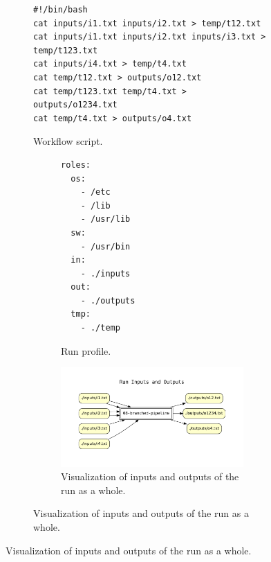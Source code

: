 \begin{figure}[h!]
    
    \begin{subfigure}[b]{1.0\linewidth}
        \begin{lstlisting}
#!/bin/bash
cat inputs/i1.txt inputs/i2.txt > temp/t12.txt
cat inputs/i1.txt inputs/i2.txt inputs/i3.txt > temp/t123.txt
cat inputs/i4.txt > temp/t4.txt
cat temp/t12.txt > outputs/o12.txt
cat temp/t123.txt temp/t4.txt > outputs/o1234.txt
cat temp/t4.txt > outputs/o4.txt
        \end{lstlisting}
        \setlength{\abovecaptionskip}{-2pt}
        \setlength{\belowcaptionskip}{15pt}
        \caption{Workflow script.}
    \end{subfigure}

    \begin{subfigure}[b]{1.0\linewidth}

        \begin{subfigure}[b]{0.25\linewidth}
            \begin{lstlisting}
roles:
  os:
    - /etc
    - /lib
    - /usr/lib
  sw:
    - /usr/bin
  in:
    - ./inputs
  out:
    - ./outputs
  tmp:
    - ./temp
            \end{lstlisting}
            \setlength{\abovecaptionskip}{-2pt}
            \setlength{\belowcaptionskip}{15pt}
            \caption{Run profile.}
        \end{subfigure}

        \begin{subfigure}[b]{0.69\linewidth}
            \includegraphics[width=\linewidth]{cpr_run_inputs_outputs.pdf}
            \setlength{\abovecaptionskip}{-5pt}
            \setlength{\belowcaptionskip}{15pt}
            \caption{Visualization of inputs and outputs of the run as a whole.}
        \end{subfigure}


\end{subfigure}
\end{figure}
